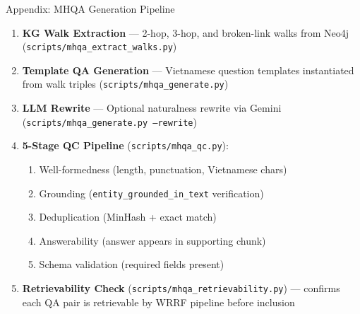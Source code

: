 \documentclass[aspectratio=169]{beamer}
\newcommand{\backupend}{%
  \addtocounter{framenumberappendix}{-\value{framenumber}}%
  \addtocounter{framenumber}{\value{framenumberappendix}}%
}
\begin{document}
\begin{frame}{Appendix: MHQA Generation Pipeline}
\begin{enumerate}\small\setlength\itemsep{3pt}
  \item \textbf{KG Walk Extraction} --- 2-hop, 3-hop, and broken-link walks from Neo4j
    (\texttt{scripts/mhqa\_extract\_walks.py})
  \item \textbf{Template QA Generation} --- Vietnamese question templates instantiated
    from walk triples (\texttt{scripts/mhqa\_generate.py})
  \item \textbf{LLM Rewrite} --- Optional naturalness rewrite via Gemini
    (\texttt{scripts/mhqa\_generate.py --rewrite})
  \item \textbf{5-Stage QC Pipeline} (\texttt{scripts/mhqa\_qc.py}):
    \begin{enumerate}\scriptsize
      \item Well-formedness (length, punctuation, Vietnamese chars)
      \item Grounding (\texttt{entity\_grounded\_in\_text} verification)
      \item Deduplication (MinHash + exact match)
      \item Answerability (answer appears in supporting chunk)
      \item Schema validation (required fields present)
    \end{enumerate}
  \item \textbf{Retrievability Check} (\texttt{scripts/mhqa\_retrievability.py}) ---
    confirms each QA pair is retrievable by WRRF pipeline before inclusion
\end{enumerate}
\end{frame}

\backupend
\end{document}
